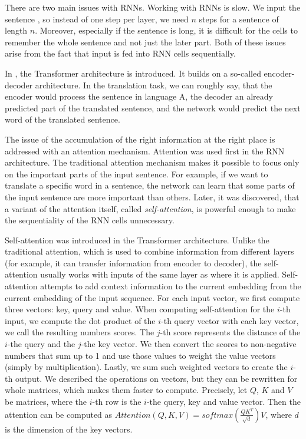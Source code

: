There are two main issues with RNNs. Working with RNNs is slow. We input the sentence , so instead of one step per layer, we need $n$ steps for a sentence of length $n$. Moreover, especially if the sentence is long, it is difficult for the cells to remember the whole sentence and not just the later part. Both of these issues arise from the fact that input is fed into RNN cells sequentially. 

In \cite{vaswani2017attention}, the Transformer architecture is introduced. It builds on a so-called encoder-decoder architecture. In the translation task, we can roughly say, that the encoder would process the sentence in language A, the decoder an already predicted part of the translated sentence, and the network would predict the next word of the translated sentence.


The issue of the accumulation of the right information at the right place is addressed with an attention mechanism. Attention was used first in the RNN architecture. The traditional attention mechanism makes it possible to focus only on the important parts of the input sentence. For example, if we want to translate a specific word in a sentence, the network can learn that some parts of the input sentence are more important than others. Later, it was discovered, that a variant of the attention itself, called \textit{self-attention}, is powerful enough to make the sequentiality of the RNN cells unnecessary.

Self-attention was introduced in the Transformer architecture. Unlike the traditional attention, which is used to combine information from different layers (for example, it can transfer information from encoder to decoder), the self-attention usually works with inputs of the same layer as where it is applied. Self-attention attempts to add context information to the current embedding from the current embedding of the input sequence. For each input vector, we first compute three vectors: key, query and value. When computing self-attention for the $i$-th input, we compute the dot product of the $i$-th query vector with each key vector, we call the resulting numbers scores. The $j$-th score represents the distance of the $i$-the query and the $j$-the key vector. We then convert the scores to non-negative numbers that sum up to 1 and use those values to weight the value vectors (simply by multiplication). Lastly, we sum such weighted vectors to create the $i$-th output. We described the operations on vectors, but they can be rewritten for whole matrices, which makes them faster to compute. Precisely, let $Q$, $K$ and $V$ be matrices, where the $i$-th row is the $i$-the query, key and value vector. Then the attention can be computed as $Attention(Q,K,V) = softmax(\frac{QK^{T}}{\sqrt{d}})V$, where $d$ is the dimension of the key vectors.


